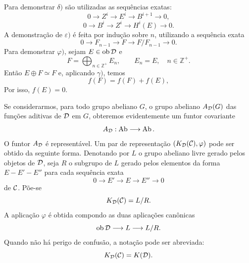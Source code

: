 Para demonstrar $\delta)$ são utilizadas as sequências exatas:
\[
0\longrightarrow Z^i\longrightarrow E^i\longrightarrow B^{i+1}\longrightarrow 0,
\]
\[
0\longrightarrow B^i\longrightarrow Z^i\longrightarrow H^i(E)\longrightarrow 0.
\]
A demonstração de $\varepsilon)$ é feita por indução sobre $n$, utilizando a sequência exata
\[
0\longrightarrow F_{n-1}\longrightarrow F\longrightarrow F/F_{n-1}\longrightarrow 0.
\]
Para demonstrar $\varphi)$, sejam $E\in\operatorname{ob}\mathcal D$ e
\[
F=\bigoplus_{n\in\mathbb Z^+}E_n,\qquad E_n=E,\quad n\in\mathbb Z^+.
\]
Então $E\oplus F\simeq F$ e, aplicando $\gamma)$, temos
\[
f(F)=f(F)+f(E),
\]
Por isso, $f(E)=0$.

Se considerarmos, para todo grupo abeliano $G$, o grupo abeliano $A_{\mathcal D}(G)$ das funções aditivas de $\mathcal D$ em $G$, obteremos evidentemente um funtor covariante
\[
A_{\mathcal D}:\operatorname{Ab}\longrightarrow\operatorname{Ab}.
\]
O funtor $A_{\mathcal D}$ é representável. Um par de representação $(K_{\mathcal D}(\mathcal C),\varphi)$ pode ser obtido da seguinte forma. Denotando por $L$ o grupo abeliano livre gerado pelos objetos de $\mathcal D$, seja $R$ o subgrupo de $L$ gerado pelos elementos da forma $E-E'-E''$ para cada sequência exata
\[
0\longrightarrow E'\longrightarrow E\longrightarrow E''\longrightarrow 0
\]
de $\mathcal C$. Põe-se
\[
K_{\mathcal D}(\mathcal C)=L/R.
\]
A aplicação $\varphi$ é obtida compondo as duas aplicações canônicas
\[
\operatorname{ob}\mathcal D\longrightarrow L\longrightarrow L/R.
\]
Quando não há perigo de confusão, a notação pode ser abreviada:
\[
K_{\mathcal D}(\mathcal C)=K(\mathcal D).
\]
